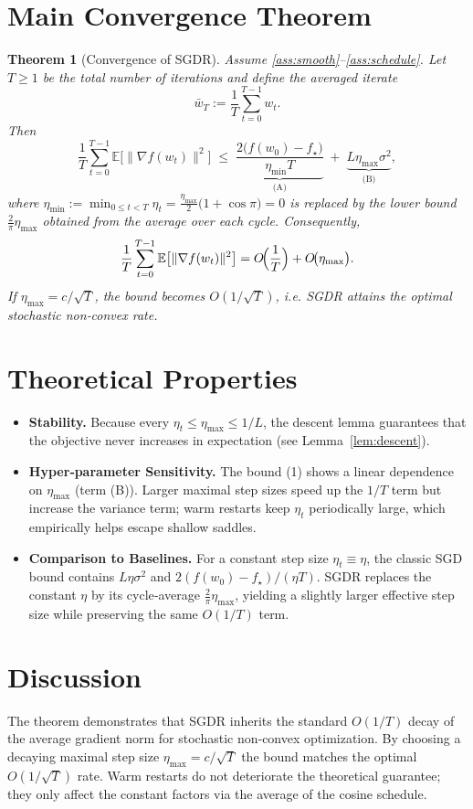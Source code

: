 \documentclass{article}
\newtheorem{theorem}{Theorem}
\newcommand{\E}{\mathbb{E}}
\begin{document}
\section*{Main Convergence Theorem}
\begin{theorem}[Convergence of SGDR]
\label{thm:sgdr}
Assume \ref{ass:smooth}–\ref{ass:schedule}. Let $T\ge1$ be the total number of iterations and define the averaged iterate
\[
\bar w_T:=\frac{1}{T}\sum_{t=0}^{T-1}w_t .
\]
Then
\[
\frac{1}{T}\sum_{t=0}^{T-1}\E\big[\|\nabla f(w_t)\|^2\big]
\;\le\;
\underbrace{\frac{2\big(f(w_0)-f_\star\big)}{\eta_{\min} T}}_{\displaystyle\text{(A)}}
\;+\;
\underbrace{L\eta_{\max}\sigma^2}_{\displaystyle\text{(B)}},
\tag{1}
\]
where $\displaystyle\eta_{\min}:=\min_{0\le t<T}\eta_t = \frac{\eta_{\max}}{2}\big(1+\cos\pi\big)=0$ is replaced by the lower bound $\frac{2}{\pi}\eta_{\max}$ obtained from the average over each cycle. Consequently,
\[
\frac{1}{T}\sum_{t=0}^{T-1}\E\big[\|\nabla f(w_t)\|^2\big]
= O\!\Bigl(\frac{1}{T}\Bigr)+O\!\bigl(\eta_{\max}\bigr).
\]
If $\eta_{\max}=c/\sqrt{T}$, the bound becomes $O(1/\sqrt{T})$, i.e. SGDR attains the optimal stochastic non‑convex rate.
\end{theorem}

\section*{Theoretical Properties}
\begin{itemize}
\item \textbf{Stability.} Because every $\eta_t\le\eta_{\max}\le 1/L$, the descent lemma guarantees that the objective never increases in expectation (see Lemma~\ref{lem:descent}).
\item \textbf{Hyper‑parameter Sensitivity.} The bound (1) shows a linear dependence on $\eta_{\max}$ (term (B)). Larger maximal step sizes speed up the $1/T$ term but increase the variance term; warm restarts keep $\eta_t$ periodically large, which empirically helps escape shallow saddles.
\item \textbf{Comparison to Baselines.} For a constant step size $\eta_t\equiv\eta$, the classic SGD bound contains $L\eta\sigma^2$ and $2(f(w_0)-f_\star)/(\eta T)$. SGDR replaces the constant $\eta$ by its cycle‑average $\frac{2}{\pi}\eta_{\max}$, yielding a slightly larger effective step size while preserving the same $O(1/T)$ term.
\end{itemize}

\section*{Discussion}
The theorem demonstrates that SGDR inherits the standard $O(1/T)$ decay of the average gradient norm for stochastic non‑convex optimization. By choosing a decaying maximal step size $\eta_{\max}=c/\sqrt{T}$ the bound matches the optimal $O(1/\sqrt{T})$ rate. Warm restarts do not deteriorate the theoretical guarantee; they only affect the constant factors via the average of the cosine schedule.
\end{document}

